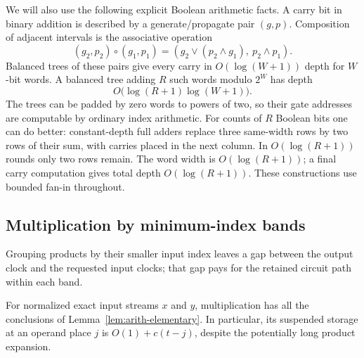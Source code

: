 We will also use the following explicit Boolean arithmetic facts.
A carry bit in binary addition is described by a generate/propagate
pair $(g,p)$.  Composition of adjacent intervals is the associative
operation
\[
 (g_2,p_2)\circ(g_1,p_1)
   =(g_2\lor(p_2\land g_1),\ p_2\land p_1).
\]
Balanced trees of these pairs give every carry in $O(\log(W+1))$
depth for $W$-bit words.  A balanced tree adding $R$ such words modulo
$2^W$ has depth
\begin{equation}
 O\bigl(\log(R+1)\log(W+1)\bigr).
 \label{eq:arith-adder-depth}
\end{equation}
The trees can be padded by zero words to powers of two, so their
gate addresses are computable by ordinary index arithmetic.
For counts of $R$ Boolean bits one can do better: constant-depth
full adders replace three same-width rows by two rows of their sum,
with carries placed in the next column.  In $O(\log(R+1))$ rounds
only two rows remain.  The word width is $O(\log(R+1))$; a final
carry computation gives total depth $O(\log(R+1))$.  These
constructions use bounded fan-in throughout.

\subsection{Multiplication by minimum-index bands}

Grouping products by their smaller input index leaves a gap between
the output clock and the requested input clocks; that gap pays for
the retained circuit path within each band.

\begin{lemma}[Multiplication]
\label{lem:arith-multiplication}
For normalized exact input streams $x$ and $y$, multiplication has all
the conclusions of Lemma~\ref{lem:arith-elementary}.  In particular,
its suspended storage at an operand place $j$ is
$O(1)+c(t-j)$, despite the potentially long product expansion.
\end{lemma}

